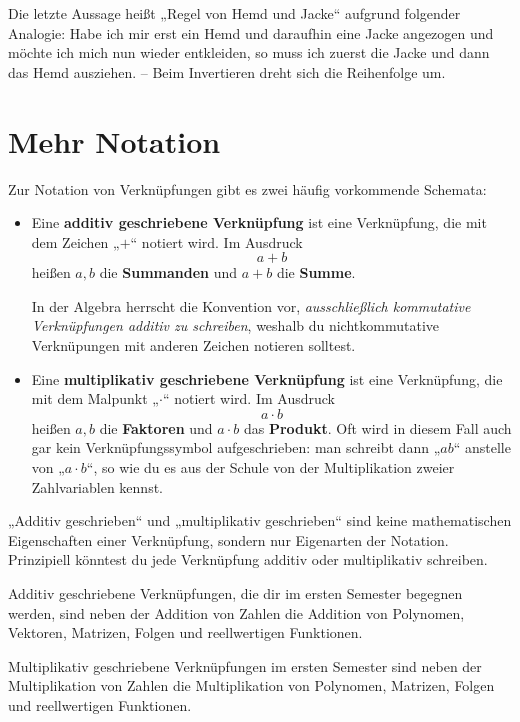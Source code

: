 \begin{bem} 
    Die letzte Aussage heißt „Regel von Hemd und Jacke“ aufgrund folgender Analogie: Habe ich mir erst ein Hemd und daraufhin eine Jacke angezogen und möchte ich mich nun wieder entkleiden, so muss ich zuerst die Jacke und dann das Hemd ausziehen. -- Beim Invertieren dreht sich die Reihenfolge um.
\end{bem}





\section{Mehr Notation}


\begin{nota}  
    Zur Notation von Verknüpfungen gibt es zwei häufig vorkommende Schemata:
    \begin{itemize}
        \item Eine \textbf{additiv geschriebene Verknüpfung} ist eine Verknüpfung, die mit dem Zeichen „$+$“ notiert wird. Im Ausdruck
            \[ a + b\]
        heißen $a,b$ die \textbf{Summanden} und $a+b$ die \textbf{Summe}.
        
        In der Algebra herrscht die Konvention vor, \emph{ausschließlich kommutative Verknüpfungen additiv zu schreiben}, weshalb du nichtkommutative Verknüpungen mit anderen Zeichen notieren solltest.
        \item Eine \textbf{multiplikativ geschriebene Verknüpfung} ist eine Verknüpfung, die mit dem Malpunkt „$\cdot$“ notiert wird. Im Ausdruck
            \[ a\cdot b \]
        heißen $a,b$ die \textbf{Faktoren} und $a\cdot b$ das \textbf{Produkt}. Oft wird in diesem Fall auch gar kein Verknüpfungssymbol aufgeschrieben: man schreibt dann „$ab$“ anstelle von „$a\cdot b$“, so wie du es aus der Schule von der Multiplikation zweier Zahlvariablen kennst.
    \end{itemize}
    „Additiv geschrieben“ und „multiplikativ geschrieben“ sind keine mathematischen Eigenschaften einer Verknüpfung, sondern nur Eigenarten der Notation. Prinzipiell könntest du jede Verknüpfung additiv oder multiplikativ schreiben.
\end{nota}


\begin{bsp}
    Additiv geschriebene Verknüpfungen, die dir im ersten Semester begegnen werden, sind neben der Addition von Zahlen die Addition von Polynomen, Vektoren, Matrizen, Folgen und reellwertigen Funktionen.
    
    Multiplikativ geschriebene Verknüpfungen im ersten Semester sind neben der Multiplikation von Zahlen die Multiplikation von Polynomen, Matrizen, Folgen und reellwertigen Funktionen.
\end{bsp}


